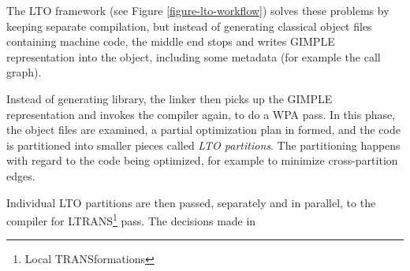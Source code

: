 The LTO framework (see Figure \ref{figure-lto-workflow}) solves these problems by keeping separate compilation, but
instead of generating classical object files containing machine code, the
middle end stops and writes GIMPLE representation into the object, including
some metadata (for example the call graph).

Instead of generating library, the linker then picks up the GIMPLE
representation and invokes the compiler again, to do a WPA pass. In this phase,
the object files are examined, a partial optimization plan in formed, and the
code is partitioned into smaller pieces called {\sl LTO partitions}. The
partitioning happens with regard to the code being optimized, for example to
minimize cross-partition edges.

Individual LTO partitions are then passed, separately and in parallel, to the
compiler for LTRANS\footnote{Local TRANSformations} pass. The decisions made in



